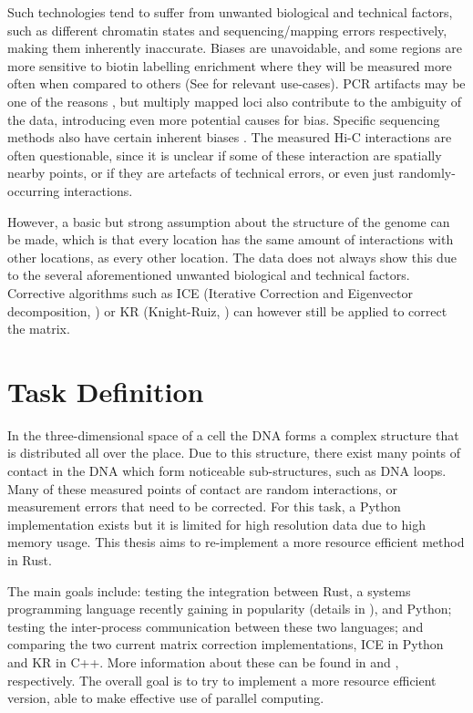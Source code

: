 Such technologies tend to suffer from unwanted biological and technical
factors, such as different chromatin states \cite{pmid19693276} and
sequencing/mapping errors \cite{pmid21646344} respectively, making them
inherently inaccurate. Biases are unavoidable, and some regions are more
sensitive to biotin labelling enrichment where they will be measured more often
when compared to others (See  for relevant use-cases). PCR
artifacts may be one of the reasons \cite{wingett2015hicup}, but multiply
mapped loci also contribute to the ambiguity of the data, introducing even more
potential causes for bias. Specific sequencing methods also have certain
inherent biases \cite{aird2011analyzing}. The measured Hi-C interactions are
often questionable, since it is unclear if some of these interaction are
spatially nearby points, or if they are artefacts of technical errors, or even
just randomly-occurring interactions.

However, a basic but strong assumption about the structure of the genome can be
made, which is that every location has the same amount of interactions with
other locations, as every other location. The data does not always show this
due to the several aforementioned unwanted biological and technical factors.
Corrective algorithms such as ICE \cite{imakaev2012iterative} (Iterative
Correction and Eigenvector decomposition, ) or KR
\cite{knight2013fast} (Knight-Ruiz, ) can however still be
applied to correct the matrix.


\newpage
\section{Task Definition}\label{sec:task}


In the three-dimensional space of a cell the DNA forms a complex structure that
is distributed all over the place. Due to this structure, there exist many
points of contact in the DNA which form noticeable sub-structures, such as DNA
loops. Many of these measured points of contact are random interactions, or
measurement errors that need to be corrected. For this task, a Python
implementation exists but it is limited for high resolution data due to high
memory usage. This thesis aims to re-implement a more resource efficient method
in Rust.

The main goals include: testing the integration between Rust, a systems
programming language recently gaining in popularity (details in
), and Python; testing the inter-process communication between
these two languages; and comparing the two current matrix correction
implementations, ICE in Python and KR in C++. More information about these can
be found in  and , respectively. The overall
goal is to try to implement a more resource efficient version, able to make
effective use of parallel computing.

